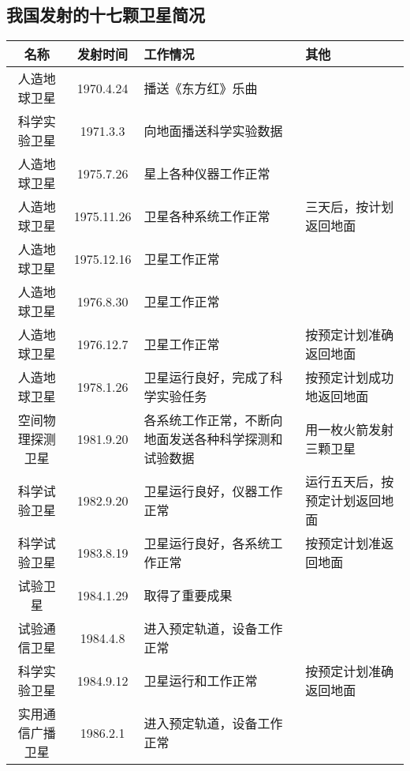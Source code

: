 \subsection{我国发射的十七颗卫星简况}

\begin{center}
	\begin{tabular}{ccp{}p{}}
		\hline
		名称	&	发射时间	&	工作情况	&	其他\\
		\hline
		人造地球卫星&	1970.4.24&	播送《东方红》乐曲\\
		科学实验卫星&		1971.3.3&		向地面播送科学实验数据\\
		人造地球卫星&		1975.7.26&		星上各种仪器工作正常\\
		人造地球卫星&1975.11.26&卫星各种系统工作正常&三天后，按计划返回地面\\
人造地球卫星&1975.12.16&卫星工作正常\\
人造地球卫星&1976.8.30&卫星工作正常\\
人造地球卫星&1976.12.7&卫星工作正常&按预定计划准确返回地面	\\
人造地球卫星&1978.1.26&卫星运行良好，完成了科学实验任务&按预定计划成功地返回地面\\
空间物理探测卫星&1981.9.20&各系统工作正常，不断向地面发送各种科学探测和试验数据&用一枚火箭发射三颗卫星\\
科学试验卫星&1982.9.20&卫星运行良好，仪器工作正常&运行五天后，按预定计划返回地面\\
科学试验卫星&1983.8.19&卫星运行良好，各系统工作正常&按预定计划准返回地面\\
试验卫星&
1984.1.29&取得了重要成果\\
试验通信卫星&1984.4.8&进入预定轨道，设备工作正常\\
科学实验卫星&1984.9.12&卫星运行和工作正常&按预定计划准确返回地面\\
实用通信广播卫星&1986.2.1&进入预定轨道，设备工作正常\\
		\hline
	\end{tabular}
\end{center}









